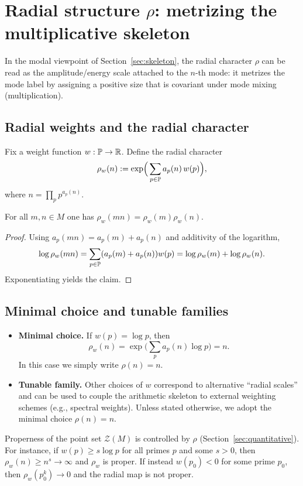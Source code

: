 \section{Radial structure \texorpdfstring{$\rho$}{rho}: metrizing the multiplicative skeleton}
\label{sec:radial}

\noindent In the modal viewpoint of Section~\ref{sec:skeleton}, the radial character $\rho$ can be read as the amplitude/energy scale attached to the $n$-th mode: it metrizes the mode label by assigning a positive size that is covariant under mode mixing (multiplication).

\subsection{Radial weights and the radial character}
Fix a weight function $w:\mathbb{P}\to\mathbb{R}$. Define the radial character
$$
\rho_w(n) := \exp\!\Big(\sum_{p\in\mathbb{P}} a_p(n)\, w(p)\Big),
$$
where $n=\prod_{p} p^{a_p(n)}$.

\begin{proposition}
\label{prop:radial_hom}
For all $m,n\in M$ one has $\rho_w(mn)=\rho_w(m)\rho_w(n)$.
\end{proposition}

\begin{proof}
Using $a_p(mn)=a_p(m)+a_p(n)$ and additivity of the logarithm,
$$
\log\rho_w(mn)=\sum_{p\in\mathbb{P}} (a_p(m)+a_p(n))w(p)=\log\rho_w(m)+\log\rho_w(n).
$$
Exponentiating yields the claim.
\end{proof}

\subsection{Minimal choice and tunable families}
\begin{itemize}
    \item \textbf{Minimal choice.} If $w(p)=\log p$, then
    $$
    \rho_w(n)=\exp\Big(\sum_p a_p(n)\log p\Big)=n.
    $$
    In this case we simply write $\rho(n)=n$.
    \item \textbf{Tunable family.} Other choices of $w$ correspond to alternative ``radial scales'' and can be used to couple the arithmetic skeleton to external weighting schemes (e.g., spectral weights). Unless stated otherwise, we adopt the minimal choice $\rho(n)=n$.
\end{itemize}

\begin{remark}
Properness of the point set $\mathcal{Z}(M)$ is controlled by $\rho$ (Section~\ref{sec:quantitative}).
For instance, if $w(p)\ge s\log p$ for all primes $p$ and some $s>0$, then $\rho_w(n)\ge n^s\to\infty$ and $\rho_w$ is proper.
If instead $w(p_0)<0$ for some prime $p_0$, then $\rho_w(p_0^k)\to 0$ and the radial map is not proper.
\end{remark}
